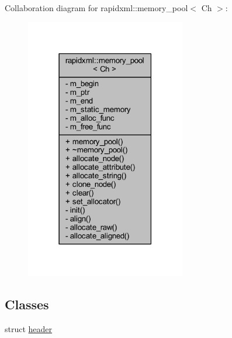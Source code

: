 Collaboration diagram for rapidxml\+:\+:memory\+\_\+pool$<$ Ch $>$\+:\nopagebreak
\begin{figure}[H]
\begin{center}
\leavevmode
\includegraphics[width=198pt]{classrapidxml_1_1memory__pool__coll__graph}
\end{center}
\end{figure}
\subsection*{Classes}
\begin{DoxyCompactItemize}
\item 
struct \hyperlink{structrapidxml_1_1memory__pool_1_1header}{header}
\end{DoxyCompactItemize}
